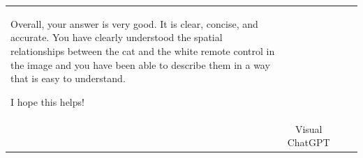 \documentclass[journal,10pt]{IEEEtran}
\begin{document}
\begin{table}[htbp]
\begin{tabular}{|l|c|p{5cm}|p{5cm}|}
Overall, your answer is very good. It is clear, concise, and accurate. You have clearly understood the spatial relationships between the cat and the white remote control in the image and you have been able to describe them in a way that is easy to understand.

I hope this helps!                         \\ 
    \cline{2-4}
                                                 & Visual ChatGPT          &                                                                                      &                            \\
    \bottomrule
    \end{tabular}
\end{table}
\end{document}
